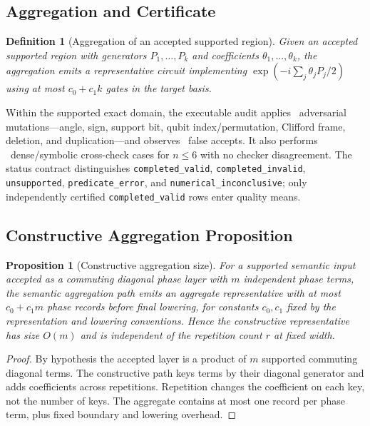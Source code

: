 \documentclass[a4paper,twocolumn,10pt,unpublished]{quantumarticle}
\newtheorem{definition}{Definition}
\newtheorem{proposition}{Proposition}
\begin{document}
\subsection{Aggregation and Certificate}

\begin{definition}[Aggregation of an accepted supported region]
\label{def:aggregation}
Given an accepted supported region with generators $P_1,\ldots,P_k$ and coefficients
$\theta_1,\ldots,\theta_k$, the aggregation emits a representative
circuit implementing $\exp(-i\sum_j \theta_j P_j / 2)$ using at most
$c_0 + c_1 k$ gates in the target basis.
\end{definition}



Within the supported exact domain, the executable audit applies
\CertificateMutationCases\ adversarial mutations---angle, sign, support bit,
qubit index/permutation, Clifford frame, deletion, and duplication---and
observes \CertificateFalseAccepts\ false accepts.  It also performs
\CertificateCrosscheckCases\ dense/symbolic cross-check cases for $n\leq6$
with no checker disagreement.  The status contract distinguishes
\texttt{completed\_valid}, \texttt{completed\_invalid},
\texttt{unsupported}, \texttt{predicate\_error}, and
\texttt{numerical\_inconclusive}; only independently certified
\texttt{completed\_valid} rows enter quality means.

\subsection{Constructive Aggregation Proposition}

\begin{proposition}[Constructive aggregation size]
\label{prop:constructive-aggregation}
For a supported semantic input accepted as a commuting diagonal phase layer
with $m$ independent phase terms, the semantic aggregation path emits an aggregate representative with at
most $c_0 + c_1 m$ phase records before final lowering, for constants
$c_0, c_1$ fixed by the representation and lowering conventions. Hence
the constructive representative has size $O(m)$ and is independent of the
repetition count $r$ at fixed width.
\end{proposition}

\begin{proof}
By hypothesis the accepted layer is a product of $m$ supported commuting
diagonal terms. The constructive
path keys terms by their diagonal generator and adds coefficients across
repetitions. Repetition changes the coefficient on each key, not the
number of keys. The aggregate contains at most one record per phase term,
plus fixed boundary and lowering overhead.
\end{proof}
\end{document}
